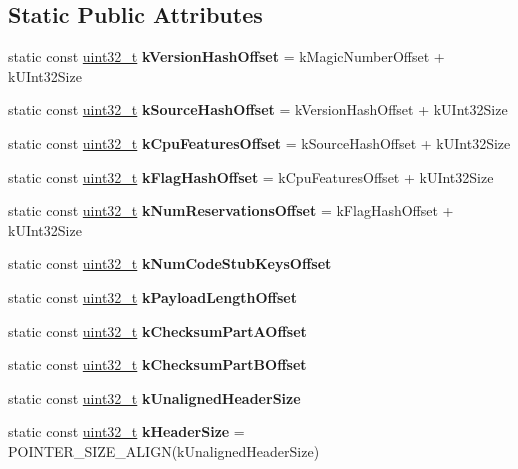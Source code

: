 \subsection*{Static Public Attributes}
\begin{DoxyCompactItemize}
\item 
\mbox{\label{classv8_1_1internal_1_1SerializedCodeData_ab8e6cc7b79c3a14d2b998c7f0292d564}} 
static const \mbox{\hyperlink{classuint32__t}{uint32\+\_\+t}} {\bfseries k\+Version\+Hash\+Offset} = k\+Magic\+Number\+Offset + k\+U\+Int32\+Size
\item 
\mbox{\label{classv8_1_1internal_1_1SerializedCodeData_a0defee17d5dabf9c83eb8184acf84782}} 
static const \mbox{\hyperlink{classuint32__t}{uint32\+\_\+t}} {\bfseries k\+Source\+Hash\+Offset} = k\+Version\+Hash\+Offset + k\+U\+Int32\+Size
\item 
\mbox{\label{classv8_1_1internal_1_1SerializedCodeData_ac3e14fee91d73ebfb9cc266169e98547}} 
static const \mbox{\hyperlink{classuint32__t}{uint32\+\_\+t}} {\bfseries k\+Cpu\+Features\+Offset} = k\+Source\+Hash\+Offset + k\+U\+Int32\+Size
\item 
\mbox{\label{classv8_1_1internal_1_1SerializedCodeData_afb5080276ae3ab8972d231e13a61371a}} 
static const \mbox{\hyperlink{classuint32__t}{uint32\+\_\+t}} {\bfseries k\+Flag\+Hash\+Offset} = k\+Cpu\+Features\+Offset + k\+U\+Int32\+Size
\item 
\mbox{\label{classv8_1_1internal_1_1SerializedCodeData_af0ef46bf65e397e30eea33a1d4f1d349}} 
static const \mbox{\hyperlink{classuint32__t}{uint32\+\_\+t}} {\bfseries k\+Num\+Reservations\+Offset} = k\+Flag\+Hash\+Offset + k\+U\+Int32\+Size
\item 
static const \mbox{\hyperlink{classuint32__t}{uint32\+\_\+t}} {\bfseries k\+Num\+Code\+Stub\+Keys\+Offset}
\item 
static const \mbox{\hyperlink{classuint32__t}{uint32\+\_\+t}} {\bfseries k\+Payload\+Length\+Offset}
\item 
static const \mbox{\hyperlink{classuint32__t}{uint32\+\_\+t}} {\bfseries k\+Checksum\+Part\+A\+Offset}
\item 
static const \mbox{\hyperlink{classuint32__t}{uint32\+\_\+t}} {\bfseries k\+Checksum\+Part\+B\+Offset}
\item 
static const \mbox{\hyperlink{classuint32__t}{uint32\+\_\+t}} {\bfseries k\+Unaligned\+Header\+Size}
\item 
\mbox{\label{classv8_1_1internal_1_1SerializedCodeData_ab6aba652952993458a92d3d19230e01c}} 
static const \mbox{\hyperlink{classuint32__t}{uint32\+\_\+t}} {\bfseries k\+Header\+Size} = P\+O\+I\+N\+T\+E\+R\+\_\+\+S\+I\+Z\+E\+\_\+\+A\+L\+I\+GN(k\+Unaligned\+Header\+Size)
\end{DoxyCompactItemize}
